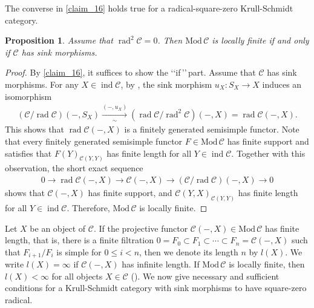 \documentclass[12pt]{amsart}
\numberwithin{equation}{subsection}
\theoremstyle{plain}
\newtheorem{proposition}[theorem]{Proposition}
\theoremstyle{definition}
\newcommand{\rad}{\operatorname{rad}}
\newcommand{\Mod}{\mathrm{Mod}\,}
\newcommand{\ind}{\operatorname{ind}}
\newcommand{\C}{\mathcal{C}}
\begin{document}
The converse in \cref{claim_16} holds true for a radical-square-zero Krull-Schmidt category.




\begin{proposition}\label{claim_29}
Assume that $\rad^2\C=0$.
Then $\Mod\C$ is locally finite if and only if $\C$ has sink morphisms.
\end{proposition}
\begin{proof}
By \cref{claim_16}, it suffices to show the \lq\lq if\,\rq\rq\,part.
Assume that $\C$ has sink morphisms.
For any $X\in\ind\C$, by \cite[Proposition 3.12]{Iyama-Nakaoka-Palu_2024}, the sink morphism $u_X: S_X \to X$ induces an isomorphism 
\begin{align}
    (\C/\rad\C)(-, S_X) \xrightarrow[\sim]{(-, u_X)}  (\rad\C/\rad^2\C)(-, X)= \rad\C(-, X).
\end{align}
This shows that $\rad\C(-, X)$ is a finitely generated semisimple functor.
Note that every finitely generated semisimple functor $F\in\Mod\C$ has finite support and satisfies that 
$F(Y)_{\C(Y, Y)}$ has finite length for all $Y\in\ind\C$.
Together with this observation, the short exact sequence 
\begin{align}
    0 \to \rad\C(-,X) \to \C(-, X)\to (\C/\rad\C)(-, X) \to 0
\end{align}
shows that $\C(-, X)$ has finite support, and $\C(Y,X)_{\C(Y,Y)}$ has finite length for all $Y\in\ind\C$.
Therefore, $\Mod\C$ is locally finite.
\end{proof}




Let $X$ be an object of $\C$.
If the projective functor $\C(-, X)\in\Mod\C$ has finite length, that is, there is a finite filtration $0=F_0 \subset F_1 \subset \cdots  \subset F_n=\C(-, X)$ such that $F_{i+1}/F_i$ is simple for $0\leq i < n$, then we denote its length $n$ by $l(X)$.
We write $l(X)=\infty$ if $\C(-, X)$ has infinite length.
If $\Mod\C$ is locally finite, then $l(X)< \infty$ for all objects $X\in\C$ (\cite[Proposition 1.11]{Auslander_1974_II}).
We now give necessary and sufficient conditions for a Krull-Schmidt category with sink morphisms to have square-zero radical.
\end{document}
